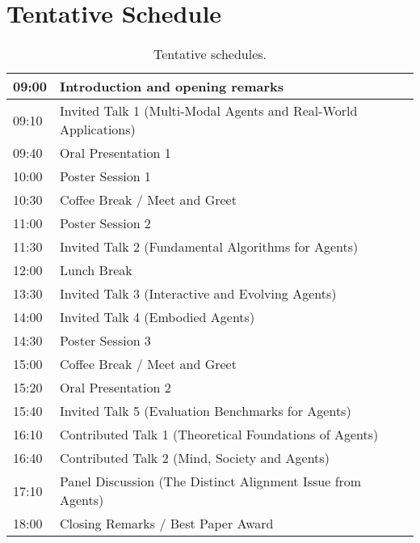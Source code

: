 \documentclass[10pt]{article} %
\begin{document}
\section{Tentative Schedule}
\begin{table}[h]
\centering
\begin{tabular}{@{}ll@{}}
\toprule
09:00 & Introduction and opening remarks                                \\ \midrule
09:10 & Invited Talk 1 (Multi-Modal Agents and Real-World Applications) \\
09:40 & Oral Presentation 1                                             \\
10:00 & Poster Session 1                                                \\
10:30 & Coffee Break / Meet and Greet                                   \\
11:00 & Poster Session 2                                                \\
11:30 & Invited Talk 2 (Fundamental Algorithms for Agents)              \\
12:00 & Lunch Break                                                     \\
13:30 & Invited Talk 3 (Interactive and Evolving Agents)                \\
14:00 & Invited Talk 4 (Embodied Agents)                                \\
14:30 & Poster Session 3                                                \\
15:00 & Coffee Break / Meet and Greet                                   \\
15:20 & Oral Presentation 2                                             \\
15:40 & Invited Talk 5 (Evaluation Benchmarks for Agents)               \\
16:10 & Contributed Talk 1 (Theoretical Foundations of Agents)          \\
16:40 & Contributed Talk 2 (Mind, Society and Agents)                   \\
17:10 & Panel Discussion (The Distinct Alignment Issue from Agents)     \\
18:00 & Closing Remarks / Best Paper Award                              \\ \bottomrule
\end{tabular}
\caption{Tentative schedules.}
\label{tab:sch}
\end{table}
\end{document}
